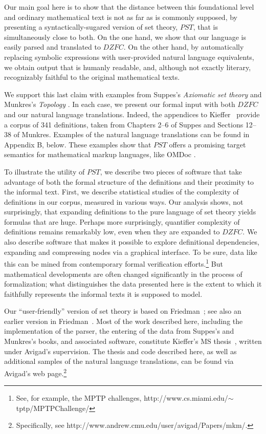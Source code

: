 \documentclass{llncs}
\newcommand{\na}[1]{\mathit{#1}}    \newcommand{\fn}[1]{\mathit{#1}}    \newcommand{\ax}[1]{\mathit{(#1)}}  \newcommand{\mdl}[1]{\mathcal{#1}}
\begin{document}
Our main goal here is to show that the distance between this
foundational level and ordinary mathematical text is not as far as is
commonly supposed, by presenting a syntactically-sugared version of
set theory, $\na{PST}$, that is simultaneously close to both. On the
one hand, we show that our language is easily parsed and translated to
$\na{DZFC}$. On the other hand, by automatically replacing symbolic
expressions with user-provided natural language equivalents, we obtain
output that is humanly readable, and, although not exactly literary,
recognizably faithful to the original mathematical texts. 

We support this last claim with examples from Suppes's \emph{Axiomatic
  set theory} \cite{suppes} and Munkres's \emph{Topology}
\cite{munkres}. In each case, we present our formal input with both
$\na{DZFC}$ and our natural language translations.
Indeed, the appendices to
Kieffer~\cite{kieffer:07} provide a corpus of 341 definitions, taken
from Chapters 2--6 of Suppes and Sections 12--38 of Munkres. Examples
of the natural language translations can be found in Appendix B,
below. These examples show that $\na{PST}$ offers a promising target
semantics for mathematical markup languages, like OMDoc
\cite{kohlhase:06}.

To illustrate the utility of $\na{PST}$, we describe two pieces of
software that take advantage of both the formal structure of the
definitions and their proximity to the informal text.  First, we
describe statistical studies of the complexity of definitions in our
corpus, measured in various ways. Our analysis shows, not
surprisingly, that expanding definitions to the pure language of set
theory yields formulas that are huge. Perhaps more surprisingly,
quantifier complexity of definitions remains remarkably low, even when
they are expanded to $\na{DZFC}$. We also describe software that makes
it possible to explore definitional dependencies, expanding and
compressing nodes via a graphical interface. To be sure, data like
this can be mined from contemporary formal verification
efforts.\footnote{See, for example, the MPTP challenges,
  http://www.cs.miami.edu/$\sim$tptp/MPTPChallenge/} But mathematical
developments are often changed significantly in the process of
formalization; what distinguishes the data presented here is the
extent to which it faithfully represents the informal texts it is
supposed to model.

Our ``user-friendly'' version of set theory is based on
Friedman~\cite{friedman:unp:05}; see also an earlier version in
Friedman~\cite{friedman:flagg:90}. Most of the work described here,
including the implementation of the parser, the entering of the data
from Suppes's and Munkres's books, and associated software,
constitute Kieffer's MS thesis~\cite{kieffer:07}, written under
Avigad's supervision. The thesis and code described here, as well as
additional samples of the natural language translations, can be found
via Avigad's web page.\footnote{Specifically, see
  http://www.andrew.cmu.edu/user/avigad/Papers/mkm/.}
\end{document}
